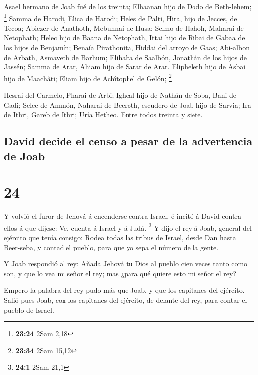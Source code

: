  Asael hermano de Joab fué de los treinta; Elhaanan hijo de
Dodo de Beth-lehem; \footnote{\textbf{23:24} 2Sam 2,18} 
Samma de Harodi, Elica de Harodi;  Heles de Palti, Hira,
hijo de Jecces, de Tecoa;  Abiezer de Anathoth, Mebunnai de
Husa;  Selmo de Hahoh, Maharai de Netophath; 
Helec hijo de Baana de Netophath, Ittai hijo de Ribai de Gabaa de los
hijos de Benjamín;  Benaía Pirathonita, Hiddai del arroyo
de Gaas;  Abi-albon de Arbath, Asmaveth de Barhum;
 Elihaba de Saalbón, Jonathán de los hijos de Jassén;
 Samma de Arar, Ahiam hijo de Sarar de Arar. 
Elipheleth hijo de Asbai hijo de Maachâti; Eliam hijo de Achîtophel de
Gelón; \footnote{\textbf{23:34} 2Sam 15,12}

 Hesrai del Carmelo, Pharai de Arbi;  Igheal
hijo de Nathán de Soba, Bani de Gadi;  Selec de Ammón,
Naharai de Beeroth, escudero de Joab hijo de Sarvia;  Ira
de Ithri, Gareb de Ithri;  Uría Hetheo. Entre todos treinta
y siete.

\hypertarget{david-decide-el-censo-a-pesar-de-la-advertencia-de-joab}{%
\subsection{David decide el censo a pesar de la advertencia de
Joab}\label{david-decide-el-censo-a-pesar-de-la-advertencia-de-joab}}

\hypertarget{section-23}{%
\section{24}\label{section-23}}

 Y volvió el furor de Jehová á encenderse contra Israel, é
incitó á David contra ellos á que dijese: Ve, cuenta á Israel y á Judá.
\footnote{\textbf{24:1} 2Sam 21,1}  Y dijo el rey á Joab,
general del ejército que tenía consigo: Rodea todas las tribus de
Israel, desde Dan hasta Beer-seba, y contad el pueblo, para que yo sepa
el número de la gente.

 Y Joab respondió al rey: Añada Jehová tu Dios al pueblo
cien veces tanto como son, y que lo vea mi señor el rey; mas ¿para qué
quiere esto mi señor el rey?

 Empero la palabra del rey pudo más que Joab, y que los
capitanes del ejército. Salió pues Joab, con los capitanes del ejército,
de delante del rey, para contar el pueblo de Israel.

